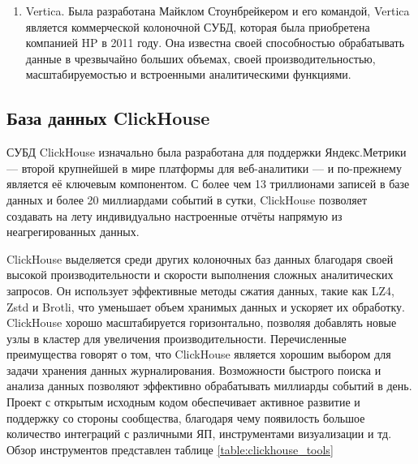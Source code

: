 \documentclass[14pt, russian]{scrartcl}
\begin{document}
\begin{enumerate}
	\item{Vertica. Была разработана Майклом Стоунбрейкером и его командой, Vertica является коммерческой колоночной СУБД, которая была приобретена компанией HP в 2011 году. Она известна своей способностью обрабатывать данные в чрезвычайно больших объемах, своей производительностью, масштабируемостью и встроенными аналитическими функциями.}
\end{enumerate}


\subsection{База данных ClickHouse}

СУБД ClickHouse \cite{ClickDocs} изначально была разработана для поддержки Яндекс.Метрики
--- второй крупнейшей в мире платформы для веб-аналитики — и по-прежнему является её ключевым компонентом.
С более чем 13 триллионами записей в базе данных и более 20 миллиардами событий в сутки,
ClickHouse позволяет создавать на лету индивидуально настроенные отчёты напрямую из неагрегированных данных.

ClickHouse выделяется среди других колоночных баз данных благодаря своей высокой производительности
и скорости выполнения сложных аналитических запросов.
Он использует эффективные методы сжатия данных, такие как LZ4, Zstd и Brotli,
что уменьшает объем хранимых данных и ускоряет их обработку.
ClickHouse хорошо масштабируется горизонтально, позволяя добавлять
новые узлы в кластер для увеличения производительности.
Перечисленные преимущества говорят о том, что ClickHouse является
хорошим выбором для задачи хранения данных журналирования. Возможности быстрого поиска
и анализа данных позволяют эффективно обрабатывать миллиарды событий в день.
Проект с открытым исходным кодом обеспечивает активное развитие и поддержку
со стороны сообщества, благодаря чему появилость большое количество интеграций
с различными ЯП, инструментами визуализации и тд. Обзор инструментов представлен таблице \ref{table:clickhouse_tools}
\end{document}
